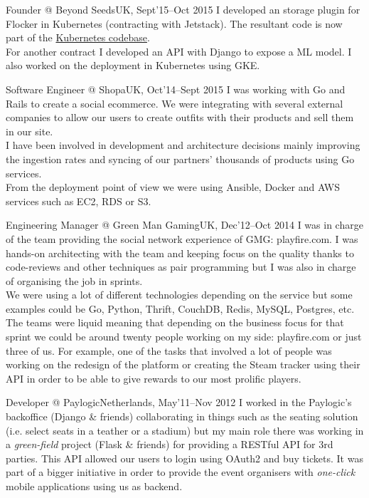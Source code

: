 \documentclass[11pt, a4paper, sans]{moderncv}
\begin{document}
\cventry{}{}
{Founder @ Beyond Seeds}{UK, Sept'15--Oct 2015}
{}{\vspace{-1em}
I developed an storage plugin for Flocker in Kubernetes (contracting with Jetstack). The resultant code is now part of the \href{https://github.com/kubernetes/kubernetes/pull/14328}{Kubernetes codebase}.\\
For another contract I developed an API with Django to expose a ML model. I also worked on the deployment in Kubernetes using GKE.\\}

\cventry{}{}
{Software Engineer @ Shopa}{UK, Oct'14--Sept 2015}
{}{\vspace{-1em}
I was working with Go and Rails to create a social ecommerce. We were integrating with several external companies to allow our users to create outfits with their products and sell them in our site.\\
I have been involved in development and architecture decisions mainly improving the ingestion rates and syncing of our partners' thousands of products using Go services.\\
From the deployment point of view we were using Ansible, Docker and AWS services such as EC2, RDS or S3.\\}

\cventry{}{}
{Engineering Manager @ Green Man Gaming}{UK, Dec'12--Oct 2014}
{}{\vspace{-1em}
I was in charge of the team providing the social network experience of GMG: playfire.com. I was hands-on architecting with the team and keeping focus on the quality thanks to code-reviews and other techniques as pair programming but I was also in charge of organising the job in sprints.\\
We were using a lot of different technologies depending on the service but some examples could be Go, Python, Thrift, CouchDB, Redis, MySQL, Postgres, etc.\\
The teams were liquid meaning that depending on the business focus for that sprint we could be around twenty people working on my side: playfire.com or just three of us. For example, one of the tasks that involved a lot of people was working on the redesign of the platform or creating the Steam tracker using their API in order to be able to give rewards to our most prolific players.\\}

\cventry{}{}
{Developer @ Paylogic}{Netherlands, May'11--Nov 2012}
{}{\vspace{-1em}
I worked in the Paylogic's backoffice (Django \& friends) collaborating in things such as the seating solution (i.e. select seats in a teather or a stadium) but my main role there was working in a \textit{green-field} project (Flask \& friends) for providing a RESTful API for 3rd parties.
This API allowed our users to login using OAuth2 and buy tickets. It was part of a bigger initiative in order to provide the event organisers with \textit{one-click} mobile applications using us as backend.\\}
\end{document}

